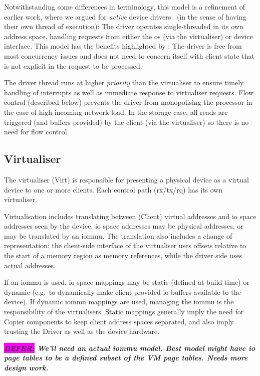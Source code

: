 \documentclass[a4paper,12pt]{report}
\newcommand{\DEFER}[1]{\textbf{\textsl{\colorbox{magenta}{DEFER:} #1}}}
\newcommand{\DEFER}[1]{\relax}
\begin{document}
Notwithstanding some differences in terminology, this model is a
refinement of earlier work, where we argued for \emph{active} device
drivers~\citep{Ryzhyk_ZH_10} (in the sense of having their own thread
of execution): The driver operates single-threaded in its own
address space, handling requests from either the \gls{os} (via the virtualiser) or device
interface. This model has the benefits
highlighted by \citet{Ryzhyk_ZH_10}: The driver is free
from most concurrency issues and does not need to concern itself with client
state that is not explicit in the request to be processed.

The driver thread runs at higher \emph{priority} than the
virtualiser to ensure timely handling of interrupts as well as immediate
response to virtualiser requests. Flow control (described below) prevents the driver from
monopolising the processor in the case of high incoming network load.
In the storage case, all reads are triggered (and buffers
provided) by the client (via the virtualiser) so there is no need for flow control.

\subsection{Virtualiser}\label{s:model_virt}

The virtualiser (Virt) is responsible for presenting a physical device as a
virtual device to one or more clients. Each control path (\gls{rx}/\gls{tx}/\gls{rq})
has its own virtualiser.

Virtualisation includes translating between (Client) virtual
addresses and \gls{io} space addresses seen by the device. \gls{io} space
addresses may be physical addresses, or may be translated by an
\gls{iommu}. The translation also includes a change of representation: the
client-side interface of the virtualiser uses offsets relative to the
start of a memory region as memory references, while the driver side
uses actual addresses.

If an \gls{iommu} is used, \gls{io}-space mappings may be static (defined at
build time) or dynamic (e.g.\ to dynamically make client-provided \gls{io}
buffers available to the device). If dynamic \gls{iommu} mappings are used,
managing the \gls{iommu} is the responsibility of the virtualisers. Static
mappings generally imply the need for Copier components to keep client
address spaces separated, and also imply trusting the Driver as well
as the device hardware.

\DEFER{We'll need an actual \gls{iommu} model. Best model might have \gls{io} page
  tables to be a defined subset of the VM page tables. Needs more
  design work.}
\end{document}
